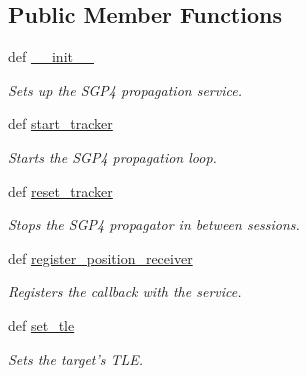 \subsection*{Public Member Functions}
\begin{DoxyCompactItemize}
\item 
def \hyperlink{classhwm_1_1hardware_1_1devices_1_1drivers_1_1sgp4__tracker_1_1sgp4__tracker_1_1_s_g_p4_propagation_service_ac8ab0781d719053c936565423bc40172}{\-\_\-\-\_\-init\-\_\-\-\_\-}
\begin{DoxyCompactList}\small\item\em Sets up the S\-G\-P4 propagation service. \end{DoxyCompactList}\item 
def \hyperlink{classhwm_1_1hardware_1_1devices_1_1drivers_1_1sgp4__tracker_1_1sgp4__tracker_1_1_s_g_p4_propagation_service_aa5112929c8703ff743fd881885076b93}{start\-\_\-tracker}
\begin{DoxyCompactList}\small\item\em Starts the S\-G\-P4 propagation loop. \end{DoxyCompactList}\item 
def \hyperlink{classhwm_1_1hardware_1_1devices_1_1drivers_1_1sgp4__tracker_1_1sgp4__tracker_1_1_s_g_p4_propagation_service_a7208ed9d9c09b3a264ea38e927b3fdb5}{reset\-\_\-tracker}
\begin{DoxyCompactList}\small\item\em Stops the S\-G\-P4 propagator in between sessions. \end{DoxyCompactList}\item 
def \hyperlink{classhwm_1_1hardware_1_1devices_1_1drivers_1_1sgp4__tracker_1_1sgp4__tracker_1_1_s_g_p4_propagation_service_ac5635340793cf2e0a0faa5e03b1fe6c9}{register\-\_\-position\-\_\-receiver}
\begin{DoxyCompactList}\small\item\em Registers the callback with the service. \end{DoxyCompactList}\item 
def \hyperlink{classhwm_1_1hardware_1_1devices_1_1drivers_1_1sgp4__tracker_1_1sgp4__tracker_1_1_s_g_p4_propagation_service_aa0cbf4299446750f017893b9ea6d8968}{set\-\_\-tle}
\begin{DoxyCompactList}\small\item\em Sets the target's T\-L\-E. \end{DoxyCompactList}\end{DoxyCompactItemize}
